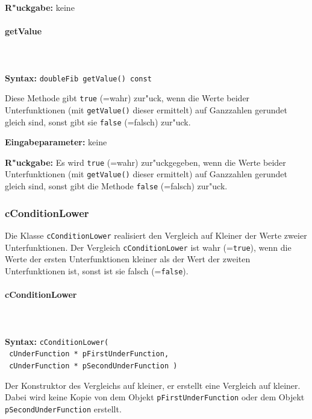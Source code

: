 \bigskip\noindent
\textbf{R"uckgabe:} keine


\paragraph{getValue}

\ \\\\\noindent
\textbf{Syntax:} \verb|doubleFib getValue() const|

\bigskip\noindent
Diese Methode gibt \verb|true| (=wahr) zur"uck, wenn die Werte beider Unterfunktionen (mit \verb|getValue()| dieser ermittelt) auf Ganzzahlen gerundet gleich sind, sonst gibt sie \verb|false| (=falsch) zur"uck.

\bigskip\noindent
\textbf{Eingabeparameter:} keine

\bigskip\noindent
\textbf{R"uckgabe:} Es wird \verb|true| (=wahr) zur"uckgegeben, wenn die Werte beider Unterfunktionen (mit \verb|getValue()| dieser ermittelt) auf Ganzzahlen gerundet gleich sind, sonst gibt die Methode \verb|false| (=falsch) zur"uck.


\subsubsection{cConditionLower}

Die Klasse \verb|cConditionLower| realisiert den Vergleich auf Kleiner der Werte zweier Unterfunktionen. Der Vergleich \verb|cConditionLower| ist wahr (=\verb|true|), wenn die Werte der ersten Unterfunktionen kleiner als der Wert der zweiten Unterfunktionen ist, sonst ist sie falsch  (=\verb|false|).


\paragraph{cConditionLower}

\ \\\\\noindent
\textbf{Syntax:} \verb|cConditionLower(| \\\verb| cUnderFunction * pFirstUnderFunction,| \\\verb| cUnderFunction * pSecondUnderFunction )|

\bigskip\noindent
Der Konstruktor des Vergleichs auf kleiner, er erstellt eine Vergleich auf kleiner. Dabei wird keine Kopie von  dem Objekt \verb|pFirstUnderFunction| oder dem Objekt \verb|pSecondUnderFunction| erstellt.

